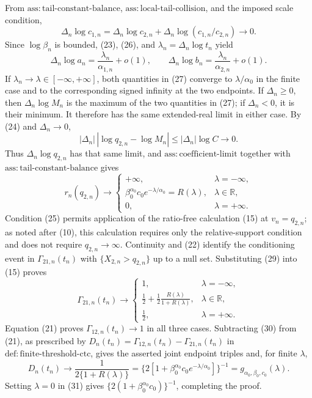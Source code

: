 From \(\mathrm{ass{:}tail\text{-}constant\text{-}balance}\), \(\mathrm{ass{:}local\text{-}tail\text{-}collision}\), and the imposed scale condition,
\[
\Delta_n\log c_{1,n}
=\Delta_n\log c_{2,n}
+\Delta_n\log(c_{1,n}/c_{2,n})\to0.
\tag{26}
\]
Since \(\log\beta_n\) is bounded, (23), (26), and \(\lambda_n=\Delta_n\log t_n\) yield
\[
\Delta_n\log a_n=\frac{\lambda_n}{\alpha_{1,n}}+o(1),
\qquad
\Delta_n\log b_n=\frac{\lambda_n}{\alpha_{2,n}}+o(1).
\tag{27}
\]
If \(\lambda_n\to\lambda\in[-\infty,+\infty]\), both quantities in (27) converge to \(\lambda/\alpha_0\) in the finite case and to the corresponding signed infinity at the two endpoints. If \(\Delta_n\geq0\), then \(\Delta_n\log M_n\) is the maximum of the two quantities in (27); if \(\Delta_n<0\), it is their minimum. It therefore has the same extended-real limit in either case. By (24) and \(\Delta_n\to0\),
\[
|\Delta_n|\,|\log q_{2,n}-\log M_n|
\leq|\Delta_n|\log C\to0.
\tag{28}
\]
Thus \(\Delta_n\log q_{2,n}\) has that same limit, and \(\mathrm{ass{:}coefficient\text{-}limit}\) together with \(\mathrm{ass{:}tail\text{-}constant\text{-}balance}\) gives
\[
r_n(q_{2,n})\longrightarrow
\begin{cases}
+\infty, & \lambda=-\infty,\\
\beta_0^{\alpha_0}c_0e^{-\lambda/\alpha_0}=R(\lambda), & \lambda\in\mathbb R,\\
0, & \lambda=+\infty.
\end{cases}
\tag{29}
\]
Condition (25) permits application of the ratio-free calculation (15) at \(v_n=q_{2,n}\); as noted after (10), this calculation requires only the relative-support condition and does not require \(q_{2,n}\to\infty\). Continuity and (22) identify the conditioning event in \(\Gamma_{21,n}(t_n)\) with \(\{X_{2,n}>q_{2,n}\}\) up to a null set. Substituting (29) into (15) proves
\[
\Gamma_{21,n}(t_n)\longrightarrow
\begin{cases}
1, & \lambda=-\infty,\\
\displaystyle\frac12+\frac12\frac{R(\lambda)}{1+R(\lambda)}, & \lambda\in\mathbb R,\\
\frac12, & \lambda=+\infty.
\end{cases}
\tag{30}
\]
Equation (21) proves \(\Gamma_{12,n}(t_n)\to1\) in all three cases. Subtracting (30) from (21), as prescribed by \(D_n(t_n)=\Gamma_{12,n}(t_n)-\Gamma_{21,n}(t_n)\) in \(\mathrm{def{:}finite\text{-}threshold\text{-}ctc}\), gives the asserted joint endpoint triples and, for finite \(\lambda\),
\[
D_n(t_n)\to\frac1{2\{1+R(\lambda)\}}
=\{2[1+\beta_0^{\alpha_0}c_0e^{-\lambda/\alpha_0}]\}^{-1}
=g_{\alpha_0,\beta_0,c_0}(\lambda).
\tag{31}
\]
Setting \(\lambda=0\) in (31) gives \(\{2(1+\beta_0^{\alpha_0}c_0)\}^{-1}\), completing the proof.
